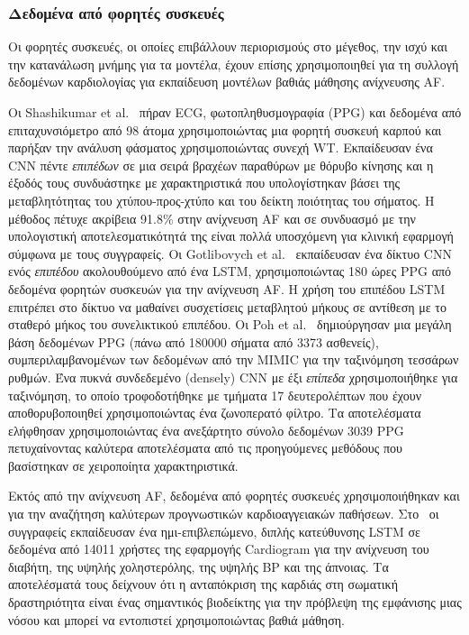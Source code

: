 \subsubsection{Δεδομένα από φορητές συσκευές}
Οι φορητές συσκευές, οι οποίες επιβάλλουν περιορισμούς στο μέγεθος, την ισχύ και την κατανάλωση μνήμης για τα μοντέλα, έχουν επίσης χρησιμοποιηθεί για τη συλλογή δεδομένων καρδιολογίας για εκπαίδευση μοντέλων βαθιάς μάθησης ανίχνευσης AF\@.

Οι Shashikumar et al.~\cite{shashikumar2017deep} πήραν ECG, φωτοπληθυσμογραφία (PPG) και δεδομένα από επιταχυνσιόμετρο από 98 άτομα χρησιμοποιώντας μια φορητή συσκευή καρπού και παρήξαν την ανάλυση φάσματος χρησιμοποιώντας συνεχή WT\@.
Εκπαίδευσαν ένα CNN πέντε \textit{επιπέδων} σε μια σειρά βραχέων παραθύρων με θόρυβο κίνησης και η έξοδός τους συνδυάστηκε με χαρακτηριστικά που υπολογίστηκαν βάσει της μεταβλητότητας του χτύπου-προς-χτύπο και του δείκτη ποιότητας του σήματος.
Η μέθοδος πέτυχε ακρίβεια 91.8\% στην ανίχνευση AF και σε συνδυασμό με την υπολογιστική αποτελεσματικότητά της είναι πολλά υποσχόμενη για κλινική εφαρμογή σύμφωνα με τους συγγραφείς.
Οι Gotlibovych et al.~\cite{gotlibovych2018end} εκπαίδευσαν ένα δίκτυο CNN ενός \textit{επιπέδου} ακολουθούμενο από ένα LSTM, χρησιμοποιώντας 180 ώρες PPG από δεδομένα φορητών συσκευών για την ανίχνευση AF\@.
Η χρήση του επιπέδου LSTM επιτρέπει στο δίκτυο να μαθαίνει συσχετίσεις μεταβλητού μήκους σε αντίθεση με το σταθερό μήκος του συνελικτικού επιπέδου.
Οι Poh et al.~\cite{poh2018diagnostic} δημιούργησαν μια μεγάλη βάση δεδομένων PPG (πάνω από 180000 σήματα από 3373 ασθενείς), συμπεριλαμβανομένων των δεδομένων από την MIMIC για την ταξινόμηση τεσσάρων ρυθμών.
Ένα πυκνά συνδεδεμένο (densely) CNN με έξι \textit{επίπεδα} χρησιμοποιήθηκε για ταξινόμηση, το οποίο τροφοδοτήθηκε με τμήματα 17 δευτερολέπτων που έχουν αποθορυβοποιηθεί χρησιμοποιώντας ένα ζωνοπερατό φίλτρο.
Τα αποτελέσματα ελήφθησαν χρησιμοποιώντας ένα ανεξάρτητο σύνολο δεδομένων 3039 PPG πετυχαίνοντας καλύτερα αποτελέσματα από τις προηγούμενες μεθόδους που βασίστηκαν σε χειροποίητα χαρακτηριστικά.

Εκτός από την ανίχνευση AF, δεδομένα από φορητές συσκευές χρησιμοποιήθηκαν και για την αναζήτηση καλύτερων προγνωστικών καρδιοαγγειακών παθήσεων.
Στο~\cite{ballinger2018deepheart} οι συγγραφείς εκπαίδευσαν ένα ημι-επιβλεπώμενο, διπλής κατεύθυνσης LSTM σε δεδομένα από 14011 χρήστες της εφαρμογής Cardiogram για την ανίχνευση του διαβήτη, της υψηλής χοληστερόλης, της υψηλής BP και της άπνοιας.
Τα αποτελέσματά τους δείχνουν ότι η ανταπόκριση της καρδιάς στη σωματική δραστηριότητα είναι ένας σημαντικός βιοδείκτης για την πρόβλεψη της εμφάνισης μιας νόσου και μπορεί να εντοπιστεί χρησιμοποιώντας βαθιά μάθηση.

